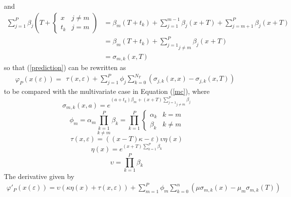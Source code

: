 \documentclass{amsart}
\begin{document}
and
\begin{equation}
  \begin{array}{ll}
    \sum_{j = 1}^P \beta_j \left( T + \left\{ \begin{array}{ll}
      x & j \neq m\\
      t_k & j = m
    \end{array} \right. \right) & = \beta_m ( T + t_k) + \sum_{j = 1}^{m - 1}
    \beta_j ( x + T) + \sum_{j = m + 1}^P \beta_j ( x + T)\\
    & = \beta_m ( T + t_k) + \underset{j \neq m}{\sum_{j = 1}^P} \beta_j (
    x_{} + T)\\
    & = \sigma_{m, k} ( x, T)
  \end{array}
\end{equation}
so that (\ref{prediction}) can be rewritten as
\begin{equation}
  \varphi_P ( x ( \varepsilon)) = \begin{array}{l}
    \tau ( x, \varepsilon) + \sum_{j = 1}^P \phi_j  \sum_{k = 0}^{N_T} (
    \sigma_{j, k} ( x, x) - \sigma_{j, k} ( x, T))^{}
  \end{array} \label{uc}
\end{equation}
to be compared with the multivariate case in Equation (\ref{mc}), where
\begin{equation}
  \sigma_{m, k} ( x, a) = e^{( a + t_k) \beta_m + ( x + T) \underset{j \neq
  m}{\sum_{j = 1}^P} \beta_j}
\end{equation}
\begin{equation}
  \phi_m = \alpha_m \underset{k \neq m}{\prod_{k = 1}^P} \beta_k = \prod_{k =
  1}^P \left\{ \begin{array}{ll}
    \alpha_k & k = m\\
    \beta_k & k \neq m
  \end{array} \right.
\end{equation}
\begin{equation}
  \tau ( x, \varepsilon) = ( ( x - T) \kappa - \varepsilon) \upsilon \eta ( x)
\end{equation}
\begin{equation}
  \eta ( x) = e^{( x + T) \sum_{k = 1}^P \beta_k}
\end{equation}
\begin{equation}
  \upsilon = \prod_{k = 1}^P \beta_k
\end{equation}
The derivative given by
\begin{equation}
  \begin{array}{l}
    \varphi'_P ( x ( \varepsilon)) = \upsilon ( \kappa \eta ( x)  + \tau ( x,
    \varepsilon)) + \sum_{m = 1}^P \phi_m  \sum_{k = 0}^n ( \mu \sigma_{m, k}
    ( x) - \mu_m \sigma_{m, k} ( T))
  \end{array} \begin{array}{l}
    \\
    
  \end{array}
\end{equation}
\end{document}
